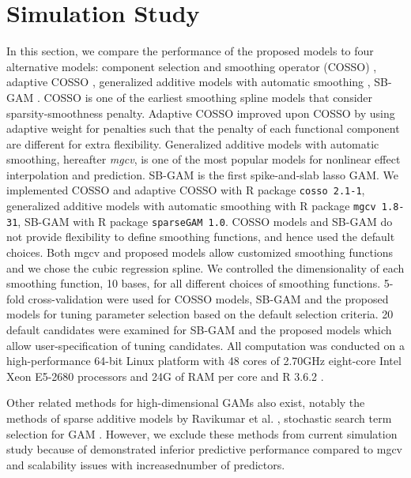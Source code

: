 \documentclass[AMA,STIX1COL,]{WileyNJD-v2}
\begin{document}
\hypertarget{simulation-study}{%
\section{Simulation Study}\label{simulation-study}}

\label{sec:sim}

In this section, we compare the performance of the proposed models to
four alternative models: component selection and smoothing operator
(COSSO) \citep{Zhang2006GAM}, adaptive COSSO \citep{Storlie2011},
generalized additive models with automatic smoothing \citep{Wood2011},
SB-GAM \citep{Bai2021}. COSSO is one of the earliest smoothing spline
models that consider sparsity-smoothness penalty. Adaptive COSSO
improved upon COSSO by using adaptive weight for penalties such that the
penalty of each functional component are different for extra
flexibility. Generalized additive models with automatic smoothing,
hereafter \textit{mgcv}, is one of the most popular models for nonlinear
effect interpolation and prediction. SB-GAM is the first spike-and-slab
lasso GAM. We implemented COSSO and adaptive COSSO with R package
\texttt{cosso 2.1-1}, generalized additive models with automatic
smoothing with R package \texttt{mgcv 1.8-31}, SB-GAM with R package
\texttt{sparseGAM 1.0}. COSSO models and SB-GAM do not provide
flexibility to define smoothing functions, and hence used the default
choices. Both mgcv and proposed models allow customized smoothing
functions and we chose the cubic regression spline. We controlled the
dimensionality of each smoothing function, 10 bases, for all different
choices of smoothing functions. 5-fold cross-validation were used for
COSSO models, SB-GAM and the proposed models for tuning parameter
selection based on the default selection criteria. 20 default candidates
were examined for SB-GAM and the proposed models which allow
user-specification of tuning candidates. All computation was conducted
on a high-performance 64-bit Linux platform with 48 cores of 2.70GHz
eight-core Intel Xeon E5-2680 processors and 24G of RAM per core and R
3.6.2 \citep{R}.

Other related methods for high-dimensional GAMs also exist, notably the
methods of sparse additive models by Ravikumar et al.
\citep{Ravikumar2009}, stochastic search term selection for GAM
\citep{Scheipl2012}. However, we exclude these methods from current
simulation study because of demonstrated inferior predictive performance
compared to mgcv and scalability issues with increasednumber of
predictors. \citep{Scheipl2013}
\end{document}
